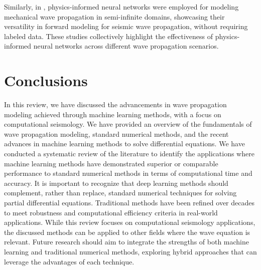 \documentclass[11pt,twoside]{article}
\begin{document}
Similarly, in , physics-informed neural networks were employed for modeling 
mechanical wave propagation in semi-infinite domains, showcasing their versatility in forward modeling for seismic 
wave propagation, without requiring labeled data. These studies collectively highlight the effectiveness of physics-informed 
neural networks across different wave propagation scenarios.

\section{Conclusions}\label{sec:conclusions}

In this review, we have discussed the advancements in wave propagation modeling achieved through machine learning
methods, with a focus on computational seismology. We have provided an overview of the fundamentals of wave
propagation modeling, standard numerical methods, and the recent advances in machine learning methods to solve
differential equations. We have conducted a systematic review of the literature to identify the applications where
machine learning methods have demonstrated superior or comparable performance to standard numerical methods in terms
of computational time and accuracy. It is important to recognize that deep learning methods should complement, 
rather than replace, standard numerical techniques for solving partial differential equations. Traditional methods 
have been refined over decades to meet robustness and computational efficiency criteria in real-world applications. 
While this review focuses on computational seismology applications, the discussed methods can be applied to other 
fields where the wave equation is relevant. Future research should aim to integrate the strengths of both machine 
learning and traditional numerical methods, exploring hybrid approaches that can leverage the advantages of each 
technique.


\end{document}
